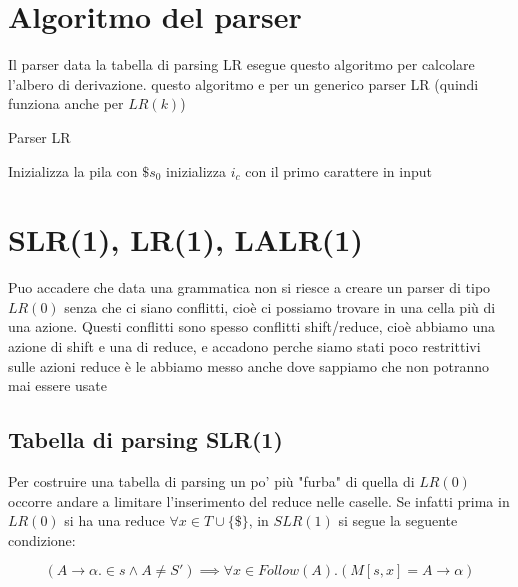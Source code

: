 \section{Algoritmo del parser}
Il parser data la tabella di parsing LR esegue questo algoritmo per calcolare l’albero di derivazione. questo
algoritmo e per un generico parser LR (quindi funziona anche per $LR(k)$)
\begin{algorithm}
        \caption{Parser LR}
        Inizializza la pila con $\$ s_0$\;
        inizializza $i_c$ con il primo carattere in input\;
\end{algorithm}

\section{SLR(1), LR(1), LALR(1)}

Puo accadere che data una grammatica non si riesce a creare un parser di tipo $LR(0)$ senza che ci siano conflitti, cioè ci possiamo trovare in una cella più di una azione. Questi conflitti sono spesso conflitti shift/reduce, cioè abbiamo una azione di shift e una di reduce, e accadono perche siamo stati poco restrittivi sulle azioni reduce è le abbiamo messo anche dove sappiamo che non potranno mai essere usate

\subsection{Tabella di parsing SLR(1)}
Per costruire una tabella di parsing un po' più "furba" di quella di $LR(0)$ occorre andare a limitare l'inserimento del reduce nelle caselle. Se infatti prima in $LR(0)$ si ha una reduce $\forall x\in T\cup\{\$\}$, in $SLR(1)$ si segue la seguente condizione:

\[
    (A\to \alpha.\in s\land A\neq S')\implies \forall x\in Follow(A).(M[s,x] = A\to\alpha)
\]

